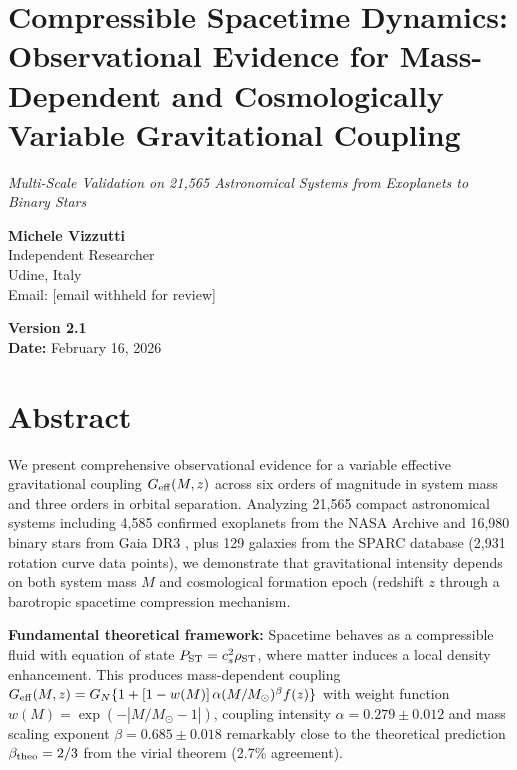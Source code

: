 \documentclass[11pt,a4paper]{article}
\begin{document}
\sloppy  %

\hypertarget{compressible-spacetime-dynamics-observational-evidence-for-mass-dependent-and-cosmologically-variable-gravitational-coupling}{%
\section*{Compressible Spacetime Dynamics: Observational Evidence for
Mass-Dependent and Cosmologically Variable Gravitational
Coupling}\label{compressible-spacetime-dynamics-observational-evidence-for-mass-dependent-and-cosmologically-variable-gravitational-coupling}}

\hypertarget{multi-scale-validation-on-21565-astronomical-systems-from-exoplanets-to-binary-stars}{%
{\large\textit{Multi-Scale Validation on 21,565 Astronomical Systems from Exoplanets to Binary Stars}}\label{multi-scale-validation-on-21565-astronomical-systems-from-exoplanets-to-binary-stars}}

\textbf{Michele Vizzutti}\\
Independent Researcher\\
Udine, Italy\\
Email: [email withheld for review]

\textbf{Version 2.1}\\
\textbf{Date:} February 16, 2026

\hypertarget{abstract}{%
\section*{Abstract}\label{abstract}}

We present comprehensive observational evidence for a variable effective
gravitational coupling \(G_{\rm eff}(M,z)\) across six orders of
magnitude in system mass and three orders in orbital separation.
Analyzing 21,565 compact astronomical systems including 4,585 confirmed
exoplanets from the NASA Archive and 16,980 binary stars from Gaia DR3 \cite{GaiaCollaboration2023a,GaiaCollaboration2023b,GaiaCollaboration2023c},
plus 129 galaxies from the SPARC database (2,931 rotation curve data points),
we demonstrate that gravitational intensity depends on both system mass
\(M\) and cosmological formation epoch (redshift \(z\) through a
barotropic spacetime compression mechanism.

\textbf{Fundamental theoretical framework:} Spacetime behaves as a
compressible fluid with equation of state
\(P_{\rm ST} = c_s^2 \rho_{\rm ST}\), where matter induces a local
density enhancement. This produces mass-dependent coupling
\(G_{\rm eff}(M,z) = G_N\{1 + [1-w(M)]\,\alpha(M/M_\odot)^\beta f(z)\}\)
with weight function \(w(M) = \exp(-|M/M_\odot - 1|)\), coupling
intensity \(\alpha = 0.279 \pm 0.012\) and mass scaling exponent
\(\beta = 0.685 \pm 0.018\) remarkably close to the theoretical
prediction \(\beta_{\rm theo} = 2/3\) from the virial theorem (2.7\%
agreement).
\end{document}
